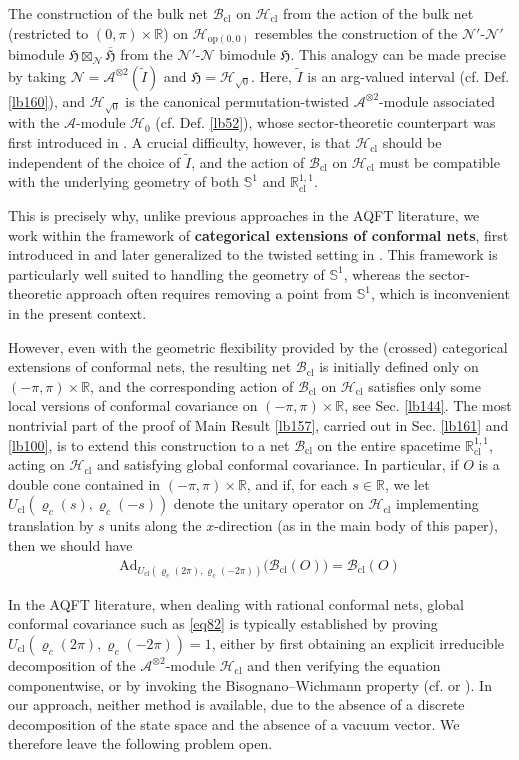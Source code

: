 \documentclass[11pt,b5paper,notitlepage]{article}
\theoremstyle{definition}
\theoremstyle{plain}
\newcommand{\fk}{\mathfrak}
\newcommand{\wtd}{\widetilde}
\newcommand{\ovl}{\overline}
\newcommand{\Ad}{\mathrm{Ad}}
\newcommand{\Rbb}{\mathbb R}
\newcommand{\Sbb}{{\mathbb S}}
\newcommand{\MA}{\mathcal A}
\newcommand{\MH}{\mathcal H}
\newcommand{\MN}{\mathcal N}
\newcommand{\Maa}{{\mathcal A^{\otimes 2}}}
\newcommand{\sqz}{{\sqrt 0}}
\newcommand{\Rcl}{\mathbb R^{1,1}_{\mathrm{cl}}}
\newcommand{\Bcl}{\mathcal B_{\mathrm{cl}}}
\newcommand{\Hcl}{\mathcal H_{\mathrm{cl}}}
\newcommand{\Ucl}{U_{\mathrm{cl}}}
\newcommand{\Hop}[1]{\mathcal H_{\mathrm{op}({#1})}}
\numberwithin{equation}{section}
\begin{document}
The construction of the bulk net $\Bcl$ on $\Hcl$ from the action of the bulk net (restricted to $(0,\pi)\times\Rbb$) on $\Hop{0,0}$ resembles the construction of the $\MN'$-$\MN'$ bimodule $\fk H\boxtimes_\MN\ovl{\fk H}$ from the $\MN'$-$\MN$ bimodule $\fk H$. This analogy can be made precise by taking $\MN=\Maa(\wtd I)$ and $\fk H=\MH_\sqz$. Here, $\wtd I$ is an arg-valued interval (cf. Def. \ref{lb160}), and $\MH_\sqz$ is the canonical permutation-twisted $\Maa$-module associated with the $\MA$-module $\MH_0$ (cf. Def. \ref{lb52}), whose sector-theoretic counterpart was first introduced in \cite{LX04}. A crucial difficulty, however, is that $\Hcl$ should be independent of the choice of $\wtd I$, and the action of $\Bcl$ on $\Hcl$ must be compatible with the underlying geometry of both $\Sbb^1$ and $\Rcl$.


This is precisely why, unlike previous approaches in the AQFT literature, we work within the framework of \textbf{categorical extensions of conformal nets}, first introduced in \cite{Gui21a} and later generalized to the twisted setting in \cite{MS26a,MS26b}. This framework is particularly well suited to handling the geometry of $\Sbb^1$, whereas the sector-theoretic approach often requires removing a point from $\Sbb^1$, which is inconvenient in the present context.


However, even with the geometric flexibility provided by the (crossed) categorical extensions of conformal nets, the resulting net $\Bcl$ is initially defined only on $(-\pi,\pi)\times\Rbb$, and the corresponding action of $\Bcl$ on $\Hcl$ satisfies only some local versions of conformal covariance on $(-\pi,\pi)\times\Rbb$, see Sec. \ref{lb144}. The most nontrivial part of the proof of Main Result \ref{lb157}, carried out in Sec. \ref{lb161} and \ref{lb100}, is to extend this construction to a net $\Bcl$ on  the entire spacetime $\Rcl$, acting on $\Hcl$ and satisfying global conformal covariance. In particular, if $O$ is a double cone contained in $(-\pi,\pi)\times\Rbb$, and if, for each $s\in\Rbb$, we let $\Ucl(\varrho_c(s),\varrho_c(-s))$ denote the unitary operator on $\Hcl$ implementing translation by $s$ units along the $x$-direction (as in the main body of this paper), then we should have
\begin{align}\label{eq82}
\Ad_{\Ucl(\varrho_c(2\pi),\varrho_c(-2\pi))}\big(\Bcl(O)\big)=\Bcl(O)
\end{align}


In the AQFT literature, when dealing with rational conformal nets, global conformal covariance such as \eqref{eq82} is typically established by proving $\Ucl(\varrho_c(2\pi),\varrho_c(-2\pi))=1$, either by first obtaining an explicit irreducible decomposition of the $\Maa$-module $\Hcl$ and then verifying the equation componentwise, or by invoking the Bisognano--Wichmann property (cf. \cite[Prop. 2.1]{KL04} or \cite[Thm. A.5]{MT19}). In our approach, neither method is available, due to the absence of a discrete decomposition of the state space and the absence of a vacuum vector. We therefore leave the following problem open.
\end{document}
